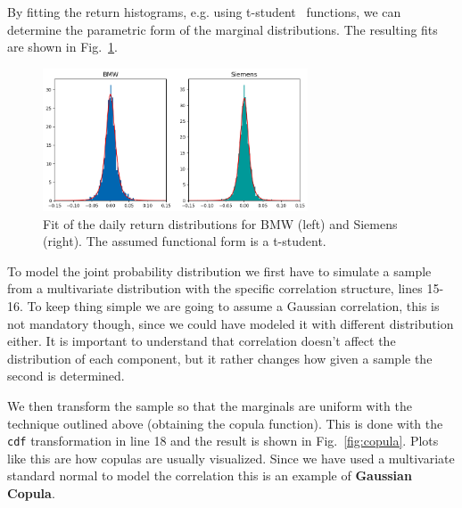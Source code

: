 
By fitting the return histograms, e.g. using t-student~\cite{bib:t_student} functions, we can determine the parametric form of the marginal distributions. The resulting fits are shown in Fig.~\ref{fig:bmw_sie_fit}.

\begin{figure}[htbp]
\centering
\includegraphics[width=0.7\textwidth]{figures/bmw_siemens_fit}
\caption{Fit of the daily return distributions for BMW (left) and Siemens (right). The assumed functional form is a t-student.}
\label{fig:bmw_sie_fit}
\end{figure}

To model the joint probability distribution we first have to simulate a sample from a multivariate distribution with the specific correlation structure, lines 15-16. To keep thing simple we are going to assume a Gaussian correlation, this is not mandatory though, since we could have modeled it with different distribution either.
It is important to understand that correlation doesn't affect the distribution of each component, but it rather changes how given a sample the second is determined.

We then transform the sample so that the marginals are uniform with the technique outlined above (obtaining the copula function). This is done with the \texttt{cdf} transformation in line 18 and the result is shown in Fig.~\ref{fig:copula}. Plots like this are how copulas are usually visualized. Since we have used a multivariate standard normal to model the correlation this is an example of \textbf{Gaussian Copula}.

